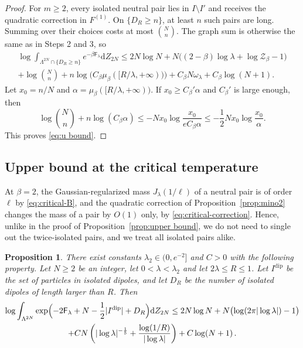 \documentclass[a4paper,10pt,leqno]{amsart}
\numberwithin{equation}{section}
\newtheorem{prop}{Proposition}[section]
\newcommand{\dd}{\mathrm{d}}
\def\mc{\mathcal}
\def\F{\mathsf{F}}
\newcommand{\dip}{\mathrm{dip}}
\begin{document}
\begin{proof}
  For $m\ge2$, every isolated neutral pair lies in $I\setminus I'$ and receives the quadratic correction in $F^{(1)}$. On $\{D_R\ge n\}$, at least $n$ such pairs are long. Summing over their choices costs at most $\binom{N}{n}$. The graph sum is otherwise the same as in Steps 2 and 3, so
  \begin{multline*}
    \log\int_{\Lambda^{2N}\cap\{D_R\ge n\}}e^{-\beta\F_\lambda}\dd Z_{2N}
    \le2N\log N+N\bigl((2-\beta)\log\lambda+\log\mc Z_\beta-1\bigr)\\
    +\log\binom{N}{n}+n\log\bigl(C_\beta\mu_\beta([R/\lambda,+\infty))\bigr)
    +C_\beta N\omega_\lambda+C_\beta\log(N+1).
  \end{multline*}
  Let $x_0=n/N$ and $\alpha=\mu_\beta([R/\lambda,+\infty))$. If $x_0\ge C_\beta'\alpha$ and $C_\beta'$ is large enough, then
  \begin{equation*}
    \log\binom{N}{n}+n\log(C_\beta\alpha)
    \le-Nx_0\log\frac{x_0}{eC_\beta\alpha}
    \le-\frac12Nx_0\log\frac{x_0}{\alpha}.
  \end{equation*}
  This proves \eqref{eq:u bound}.
\end{proof}

\subsection{Upper bound at the critical temperature}

At $\beta=2$, the Gaussian-regularized mass $J_\lambda(1/\ell)$ of a neutral pair is of order $\ell$ by \eqref{eq:critical-B}, and the quadratic correction of Proposition~\ref{prop:mino2} changes the mass of a pair by $O(1)$ only, by \eqref{eq:critical-correction}. Hence, unlike in the proof of Proposition~\ref{prop:upper bound}, we do not need to single out the twice-isolated pairs, and we treat all isolated pairs alike.

\begin{prop}\label{prop:critical upper}
  There exist constants $\lambda_2\in(0,e^{-2}]$ and $C>0$ with the following property. Let $N\ge2$ be an integer, let $0<\lambda<\lambda_2$ and let $2\lambda\le R\le1$. Let $I^{\dip}$ be the set of particles in isolated dipoles, and let $D_R$ be the number of isolated dipoles of length larger than $R$. Then
  \begin{multline}\label{eq:critical upper}
    \log\int_{\Lambda^{2N}}\exp\Bigl(-2\F_\lambda+N-\frac12|I^{\dip}|+D_R\Bigr)\dd Z_{2N}
    \le2N\log N+N\bigl(\log(2\pi|\log\lambda|)-1\bigr)\\
    +CN\left(|\log\lambda|^{-\frac15}+\frac{\log(1/R)}{|\log\lambda|}\right)+C\log(N+1)\,.
  \end{multline}
\end{prop}
\end{document}
